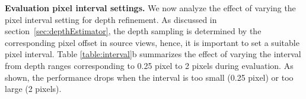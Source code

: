 \noindent\textbf{Evaluation pixel interval settings.} We now analyze the effect of varying the pixel interval setting for depth refinement. As discussed in section~\ref{sec:depthEstimator}, the depth sampling is determined by the corresponding pixel offset in source views, hence, it is important to set a suitable pixel interval. Table \ref{table:interval}b summarizes the effect of varying the interval from depth ranges corresponding to 0.25 pixel to 2 pixels during \mbox{evaluation}. As shown, the performance drops when the interval is too small (0.25 pixel) or too large (2 pixels).